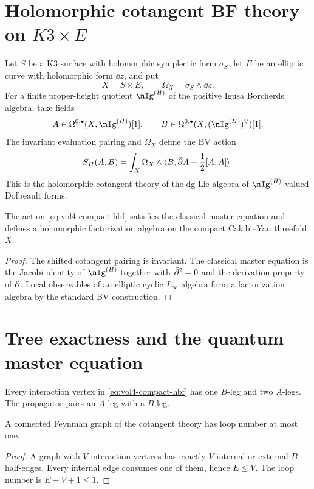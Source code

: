 \chapter{Holomorphic cotangent BF theory on \texorpdfstring{$K3\times E$}{K3 x E}}
Let $S$ be a K3 surface with holomorphic symplectic form $\sigma_S$, let $E$ be an elliptic curve with holomorphic form $\dd z$, and put
\[
 X=S\times E,
 \qquad
 \Omega_X=\sigma_S\wedge\dd z.
\]
For a finite proper-height quotient $\nIg^{(H)}$ of the positive Igusa Borcherds algebra, take fields
\[
 A\in\Omega^{0,\bullet}(X,\nIg^{(H)})[1],
 \qquad
 B\in\Omega^{0,\bullet}(X,(\nIg^{(H)})^\vee)[1].
\]
The invariant evaluation pairing and $\Omega_X$ define the BV action
\begin{equation}\label{eq:vol4-compact-hbf}
 S_H(A,B)=
 \int_X\Omega_X\wedge
 \langle B,\bar\partial A+\frac12[A,A]\rangle.
\end{equation}
This is the holomorphic cotangent theory of the dg Lie algebra of $\nIg^{(H)}$-valued Dolbeault forms.

\begin{theorem}
The action \eqref{eq:vol4-compact-hbf} satisfies the classical master equation and defines a holomorphic factorization algebra on the compact Calabi--Yau threefold $X$.
\end{theorem}
\begin{proof}
The shifted cotangent pairing is invariant.  The classical master equation is the Jacobi identity of $\nIg^{(H)}$ together with $\bar\partial^2=0$ and the derivation property of $\bar\partial$.  Local observables of an elliptic cyclic $L_\infty$ algebra form a factorization algebra by the standard BV construction.
\end{proof}

\chapter{Tree exactness and the quantum master equation}
Every interaction vertex in \eqref{eq:vol4-compact-hbf} has one $B$-leg and two $A$-legs.  The propagator pairs an $A$-leg with a $B$-leg.

\begin{lemma}
A connected Feynman graph of the cotangent theory has loop number at most one.
\end{lemma}
\begin{proof}
A graph with $V$ interaction vertices has exactly $V$ internal or external $B$-half-edges.  Every internal edge consumes one of them, hence $E\le V$.  The loop number is $E-V+1\le1$.
\end{proof}

